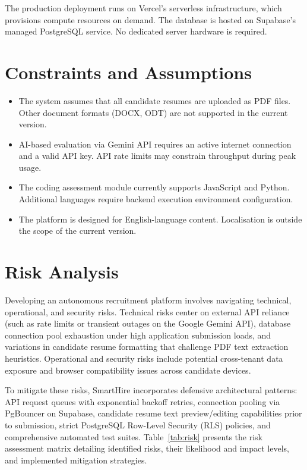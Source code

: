 The production deployment runs on Vercel's serverless infrastructure, which provisions compute resources on demand. The database is hosted on Supabase's managed PostgreSQL service. No dedicated server hardware is required.

\section{Constraints and Assumptions}
\label{sec:constraints}

\begin{itemize}[leftmargin=1.5em]
  \item The system assumes that all candidate resumes are uploaded as PDF files. Other document formats (DOCX, ODT) are not supported in the current version.
  \item AI-based evaluation via Gemini API requires an active internet connection and a valid API key. API rate limits may constrain throughput during peak usage.
  \item The coding assessment module currently supports JavaScript and Python. Additional languages require backend execution environment configuration.
  \item The platform is designed for English-language content. Localisation is outside the scope of the current version.
\end{itemize}

\section{Risk Analysis}
\label{sec:risk}

Developing an autonomous recruitment platform involves navigating technical, operational, and security risks. Technical risks center on external API reliance (such as rate limits or transient outages on the Google Gemini API), database connection pool exhaustion under high application submission loads, and variations in candidate resume formatting that challenge PDF text extraction heuristics. Operational and security risks include potential cross-tenant data exposure and browser compatibility issues across candidate devices.

To mitigate these risks, SmartHire incorporates defensive architectural patterns: API request queues with exponential backoff retries, connection pooling via PgBouncer on Supabase, candidate resume text preview/editing capabilities prior to submission, strict PostgreSQL Row-Level Security (RLS) policies, and comprehensive automated test suites. Table~\ref{tab:risk} presents the risk assessment matrix detailing identified risks, their likelihood and impact levels, and implemented mitigation strategies.

